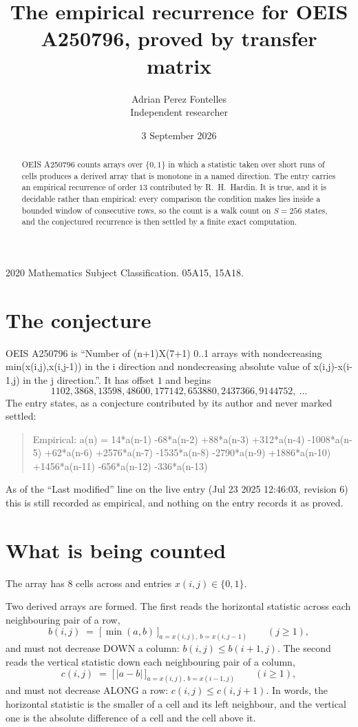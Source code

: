 \documentclass[11pt,a4paper]{article}
\title{The empirical recurrence for OEIS A250796, proved by transfer matrix}
\author{Adrian Perez Fontelles\\ \small Independent researcher}
\date{3 September 2026}
\theoremstyle{plain}
\theoremstyle{definition}
\begin{document}
\maketitle

\begin{abstract}
OEIS A250796 counts arrays over $\{0,1\}$ in which a statistic taken over short runs
of cells produces a derived array that is monotone in a named direction. The entry carries an
empirical recurrence of order $13$ contributed by R.~H.~Hardin. It is true, and it is
decidable rather than empirical: every comparison the condition makes lies inside a bounded
window of consecutive rows, so the count is a walk count on $S=256$ states, and the
conjectured recurrence is then settled by a finite exact computation.
\end{abstract}

\noindent\small 2020 Mathematics Subject Classification. 05A15, 15A18.\normalsize

\section{The conjecture}

OEIS A250796 is ``Number of (n+1)X(7+1) 0..1 arrays with nondecreasing min(x(i,j),x(i,j-1)) in the i direction and nondecreasing absolute value of x(i,j)-x(i-1,j) in the j direction.''. It has offset $1$ and begins
\[
1102, 3868, 13598, 48600, 177142, 653880, 2437366, 9144752,\ \dots
\]
The entry states, as a conjecture contributed by its author and never marked settled:
\begin{quote}
Empirical: a(n) = 14*a(n-1) -68*a(n-2) +88*a(n-3) +312*a(n-4) -1008*a(n-5) +62*a(n-6) +2576*a(n-7) -1535*a(n-8) -2790*a(n-9) +1886*a(n-10) +1456*a(n-11) -656*a(n-12) -336*a(n-13)
\end{quote}
As of the ``Last modified'' line on the live entry (Jul 23 2025 12:46:03, revision 6) this is still
recorded as empirical, and nothing on the entry records it as proved.

\section{What is being counted}

The array has $8$ cells across and entries $x(i,j)\in\{0,1\}$.

Two derived arrays are formed. The first reads the horizontal statistic across each
neighbouring pair of a row,
\[
b(i,j)\;=\;\bigl[\,\min(a,b)\,\bigr]_{a=x(i,j),\,b=x(i,j-1)}\qquad (j\ge1),
\]
and must not decrease DOWN a column: $b(i,j)\le b(i{+}1,j)$. The second reads the vertical
statistic down each neighbouring pair of a column,
\[
c(i,j)\;=\;\bigl[\,\lvert a-b\rvert\,\bigr]_{a=x(i,j),\,b=x(i{-}1,j)}\qquad (i\ge1),
\]
and must not decrease ALONG a row: $c(i,j)\le c(i,j{+}1)$. In words, the horizontal statistic
is the smaller of a cell and its left neighbour, and the vertical one is
the absolute difference of a cell and the cell above it.
\end{document}
